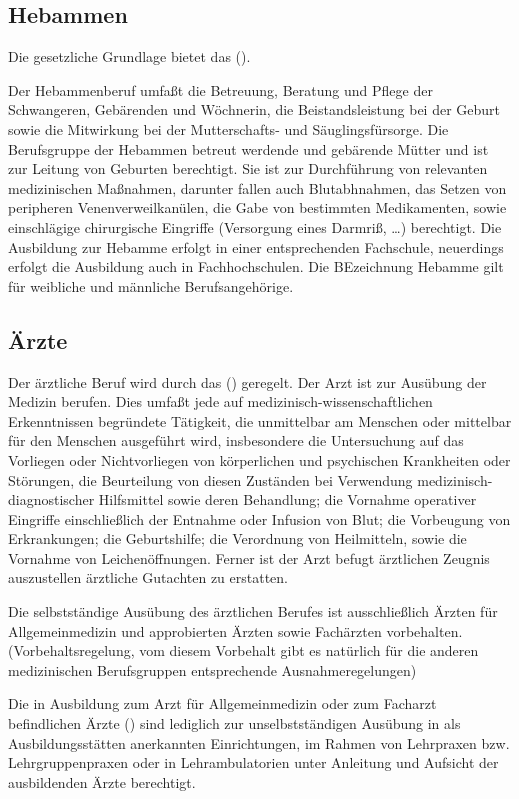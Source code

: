\documentclass[
ngerman,
paper=a4,
asymmetric,
fontsize=10pt,
draft=false,
numbers=noenddot,
bibtotocnumbered,
footnotes=multiple,
]{scrreprt}
\newcommand{\jNEU}{\vspace{6pt}\noindent{\color{green}\sffamily\textbf{ADDED}\hrulefill\newline}}
\newcommand{\jNEUende}{\newline{\color{green}\rule{\linewidth}{3pt}\newline}}
\begin{document}
\subsection{Hebammen}
\jNEU
Die gesetzliche Grundlage bietet das 
().

Der Hebammenberuf umfaßt die Betreuung, Beratung und Pflege
der Schwangeren, Gebärenden und Wöchnerin, die Beistandsleistung bei der Geburt sowie die Mitwirkung bei der Mutterschafts- und Säuglingsfürsorge. Die Berufsgruppe der Hebammen betreut werdende und gebärende
Mütter und ist zur Leitung von Geburten berechtigt.
Sie ist zur Durchführung von relevanten medizinischen
Maßnahmen, darunter fallen auch Blutabhnahmen, das Setzen von
peripheren Venenverweilkanülen, die Gabe von bestimmten Medikamenten, sowie einschlägige chirurgische
Eingriffe (Versorgung eines Darmriß, \ldots) berechtigt.
Die Ausbildung zur Hebamme erfolgt in einer entsprechenden
Fachschule, neuerdings erfolgt die Ausbildung auch in
Fachhochschulen. Die BEzeichnung Hebamme gilt für weibliche
und männliche Berufsangehörige.
\jNEUende

\subsection{Ärzte}
\jNEU
Der ärztliche Beruf wird durch das  () geregelt.
Der Arzt ist zur Ausübung der Medizin berufen. Dies umfaßt
jede auf medizinisch-wissenschaftlichen Erkenntnissen
begründete Tätigkeit, die unmittelbar am Menschen oder
mittelbar für den Menschen ausgeführt wird, insbesondere 
die Untersuchung auf das Vorliegen oder Nichtvorliegen von körperlichen und psychischen Krankheiten oder Störungen,
die Beurteilung von diesen Zuständen bei Verwendung medizinisch-diagnostischer Hilfsmittel sowie deren Behandlung;
die Vornahme operativer Eingriffe einschließlich der Entnahme oder Infusion von Blut;
die Vorbeugung von Erkrankungen;
die Geburtshilfe;
die Verordnung von Heilmitteln, sowie
die Vornahme von Leichenöffnungen.
Ferner ist
der Arzt befugt ärztlichen Zeugnis auszustellen ärztliche
Gutachten zu erstatten.


Die selbstständige Ausübung des ärztlichen Berufes
ist ausschließlich Ärzten für Allgemeinmedizin und
approbierten Ärzten sowie Fachärzten vorbehalten.
(Vorbehaltsregelung, vom diesem Vorbehalt gibt es
natürlich für die anderen medizinischen Berufsgruppen
entsprechende Ausnahmeregelungen)

Die in Ausbildung zum Arzt für Allgemeinmedizin oder zum
Facharzt befindlichen Ärzte () sind lediglich zur
unselbstständigen Ausübung  in  als
Ausbildungsstätten anerkannten Einrichtungen, im Rahmen von
Lehrpraxen bzw. Lehrgruppenpraxen oder in Lehrambulatorien
unter Anleitung und Aufsicht der ausbildenden Ärzte
berechtigt.
\end{document}
